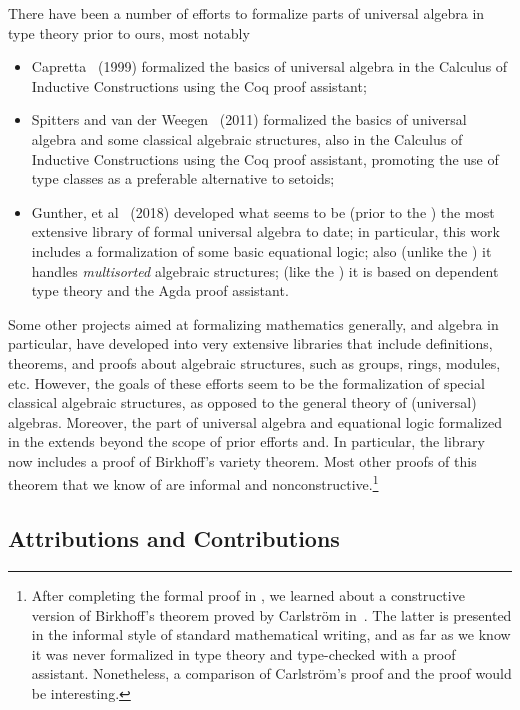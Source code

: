 There have been a number of efforts to formalize parts of universal algebra in type theory prior to ours, most notably
\begin{itemize}
  \item Capretta~\cite{Capretta:1999} (1999) formalized the basics of universal algebra in the Calculus of Inductive Constructions using the Coq proof assistant;
    \item Spitters and van der Weegen~\cite{Spitters:2011} (2011) formalized the basics of universal algebra and some classical algebraic structures, also in the Calculus of Inductive Constructions using the Coq proof assistant, promoting the use of type classes as a preferable alternative to setoids;
 \item Gunther, et al~\cite{Gunther:2018} (2018) developed what seems to be (prior to the \ualib) the most extensive library of formal universal algebra to date; in particular, this work includes a formalization of some basic equational logic; also (unlike the \ualib) it handles \emph{multisorted} algebraic structures; (like the \ualib) it is based on dependent type theory and the Agda proof assistant.
\end{itemize}
Some other projects aimed at formalizing mathematics generally, and algebra in particular, have developed into very extensive libraries that include definitions, theorems, and proofs about algebraic structures, such as groups, rings, modules, etc.  However, the goals of these efforts seem to be the formalization of special classical algebraic structures, as opposed to the general theory of (universal) algebras. Moreover, the part of universal algebra and equational logic formalized in the \ualib extends beyond the scope of prior efforts and. In particular, the library now includes a proof of Birkhoff's variety theorem.  Most other proofs of this theorem that we know of are informal and nonconstructive.\footnote{After completing the formal proof in \agda, we learned about a constructive version of Birkhoff's theorem proved by Carlstr\"om in~\cite{Carlstrom:2008}.  The latter is presented in the informal style of standard mathematical writing, and as far as we know it was never formalized in type theory and type-checked with a proof assistant. Nonetheless, a comparison of Carlstr\"om's proof and the \ualib proof would be interesting.}




\subsection{Attributions and Contributions}\label{sec:contributions}


